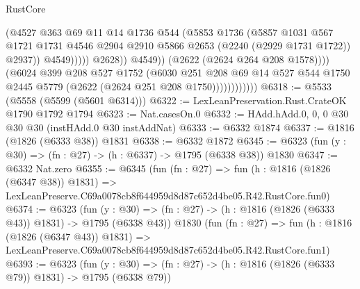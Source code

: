 \begin{lexlean}{RustCore}
\begin{coremodule}
                                        (@4527
                                          @363
                                          @69
                                          @11
                                          @14
                                          @1736
                                          @544
                                          (@5853
                                            @1736
                                            (@5857
                                              @1031
                                              @567
                                              @1721
                                              @1731
                                              @4546
                                              @2904
                                              @2910
                                              @5866
                                              @2653
                                              (@2240 (@2929 @1731 @1722))
                                              @2937))
                                          @4549)))))
                                @2628))
                            @4549))
                        (@2622 (@2624 @264 @208 @1578))))
                    (@6024
                      @399
                      @208
                      @527
                      @1752
                      (@6030
                        @251
                        @208
                        @69
                        @14
                        @527
                        @544
                        @1750
                        @2445
                        @5779
                        (@2622 (@2624 @251 @208 @1750))))))))))))
@6318 := @5533 (@5558 (@5599 (@5601 @6314)))
@6322 := LexLeanPreservation.Rust.CrateOK @1790 @1792 @1794
@6323 := Nat.casesOn.{0}
@6332 := HAdd.hAdd.{0, 0, 0} @30 @30 @30 (instHAdd.{0} @30 instAddNat)
@6333 := @6332 @1874
@6337 := @1816 (@1826 (@6333 @38)) @1831
@6338 := @6332 @1872
@6345 := @6323 (fun (y : @30) => (fn : @27) -> (h : @6337) -> @1795 (@6338 @38)) @1830
@6347 := @6332 Nat.zero
@6355 := @6345
    (fun (fn : @27) =>
    fun (h : @1816 (@1826 (@6347 @38)) @1831) =>
    LexLeanPreserve.C69a0078cb8f644959d8d87c652d4be05.R42.RustCore.fun0)
@6374 := @6323
    (fun (y : @30) => (fn : @27) -> (h : @1816 (@1826 (@6333 @43)) @1831) -> @1795 (@6338 @43))
    @1830
    (fun (fn : @27) =>
    fun (h : @1816 (@1826 (@6347 @43)) @1831) =>
    LexLeanPreserve.C69a0078cb8f644959d8d87c652d4be05.R42.RustCore.fun1)
@6393 := @6323
    (fun (y : @30) => (fn : @27) -> (h : @1816 (@1826 (@6333 @79)) @1831) -> @1795 (@6338 @79))

\end{coremodule}
\end{lexlean}
